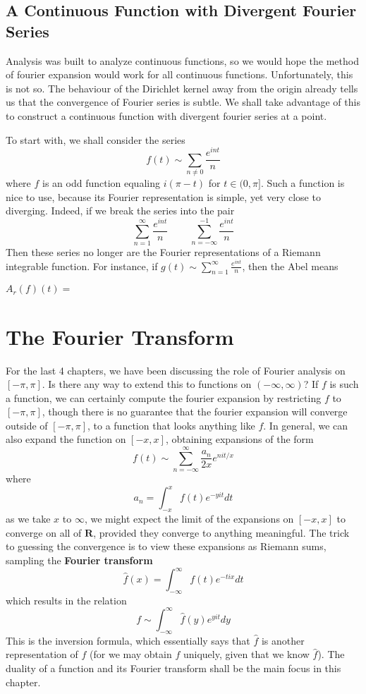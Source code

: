\section{A Continuous Function with Divergent Fourier Series}

Analysis was built to analyze continuous functions, so we would hope the method of fourier expansion would work for all continuous functions. Unfortunately, this is not so. The behaviour of the Dirichlet kernel away from the origin already tells us that the convergence of Fourier series is subtle. We shall take advantage of this to construct a continuous function with divergent fourier series at a point.

To start with, we shall consider the series
%
\[ f(t) \sim \sum_{n \neq 0} \frac{e^{int}}{n} \]
%
where $f$ is an odd function equaling $i(\pi - t)$ for $t \in (0,\pi]$. Such a function is nice to use, because its Fourier representation is simple, yet very close to diverging. Indeed, if we break the series into the pair
%
\[ \sum_{n = 1}^\infty  \frac{e^{int}}{n}\ \ \ \ \ \ \ \ \ \ \sum_{n = -\infty}^{-1} \frac{e^{int}}{n} \]
%
Then these series no longer are the Fourier representations of a Riemann integrable function. For instance, if $g(t) \sim \sum_{n = 1}^\infty \frac{e^{int}}{n}$, then the Abel means

$A_r(f)(t) = $


\chapter{The Fourier Transform}

For the last 4 chapters, we have been discussing the role of Fourier analysis on $[-\pi,\pi]$. Is there any way to extend this to functions on $(-\infty,\infty)$? If $f$ is such a function, we can certainly compute the fourier expansion by restricting $f$ to $[-\pi,\pi]$, though there is no guarantee that the fourier expansion will converge outside of $[-\pi,\pi]$, to a function that looks anything like $f$. In general, we can also expand the function on $[-x,x]$, obtaining expansions of the form
%
\[ f(t) \sim \sum_{n = -\infty}^\infty \frac{a_n}{2x} e^{nit/x} \]
%
where
%
\[ a_n = \int_{-x}^x f(t) e^{-yit} dt \]
%
as we take $x$ to $\infty$, we might expect the limit of the expansions on $[-x,x]$ to converge on all of $\mathbf{R}$, provided they converge to anything meaningful. The trick to guessing the convergence is to view these expansions as Riemann sums, sampling the {\bf Fourier transform}
%
\[ \widehat{f}(x) = \int_{-\infty}^\infty f(t) e^{-tix} dt \]
%
which results in the relation
%
\[ f \sim \int_{-\infty}^\infty \widehat{f}(y) e^{yit} dy \]
%
This is the inversion formula, which essentially says that $\widehat{f}$ is another representation of $f$ (for we may obtain $f$ uniquely, given that we know $\widehat{f}$). The duality of a function and its Fourier transform shall be the main focus in this chapter.

